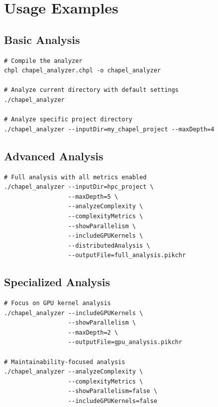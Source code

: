 \documentclass[11pt,a4paper]{article}
\begin{document}
\section{Usage Examples}

\subsection{Basic Analysis}

\begin{lstlisting}[style=chapel, caption=Basic Project Analysis]
# Compile the analyzer
chpl chapel_analyzer.chpl -o chapel_analyzer

# Analyze current directory with default settings
./chapel_analyzer

# Analyze specific project directory
./chapel_analyzer --inputDir=my_chapel_project --maxDepth=4
\end{lstlisting}

\subsection{Advanced Analysis}

\begin{lstlisting}[style=chapel, caption=Comprehensive Analysis]
# Full analysis with all metrics enabled
./chapel_analyzer --inputDir=hpc_project \
                  --maxDepth=5 \
                  --analyzeComplexity \
                  --complexityMetrics \
                  --showParallelism \
                  --includeGPUKernels \
                  --distributedAnalysis \
                  --outputFile=full_analysis.pikchr
\end{lstlisting}

\subsection{Specialized Analysis}

\begin{lstlisting}[style=chapel, caption=GPU-Focused Analysis]
# Focus on GPU kernel analysis
./chapel_analyzer --includeGPUKernels \
                  --showParallelism \
                  --maxDepth=2 \
                  --outputFile=gpu_analysis.pikchr

# Maintainability-focused analysis
./chapel_analyzer --analyzeComplexity \
                  --complexityMetrics \
                  --showParallelism=false \
                  --includeGPUKernels=false
\end{lstlisting}
\end{document}
